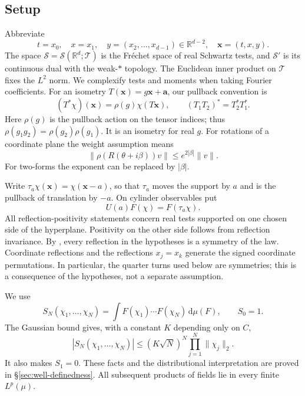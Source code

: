 \documentclass[11pt, letterpaper, reqno]{amsart}
\theoremstyle{definition}
\theoremstyle{remark}
\newcommand{\bbR}{\mathbb{R}}
\newcommand{\calS}{\mathcal{S}}
\newcommand{\calT}{\mathcal{T}}
\newcommand{\bfa}{\mathbf{a}}
\newcommand{\bfx}{\mathbf{x}}
\newcommand{\dd}{\,\mathrm{d}}
\begin{document}
\tableofcontents

\subsection{Setup}
\label{subsec:setup}

Abbreviate
\begin{equation}
 t=x_0,\quad x=x_1,\quad y=(x_2,\dots,x_{d-1})\in\bbR^{d-2},
 \quad \bfx=(t,x,y).
\end{equation}
The space $\calS=\calS(\bbR^d;\calT)$ is the Fr\'echet space of real
Schwartz tests, and $\calS'$ is its continuous dual with the weak-$*$
topology. The Euclidean inner product on $\calT$ fixes the $L^2$ norm.
We complexify tests and moments when taking Fourier coefficients.
For an isometry $T(\bfx)=g\bfx+\bfa$, our pullback convention is
\begin{equation}\label{eq:pullback}
 (T^*\chi)(\bfx)=\rho(g)\chi(T\bfx),\qquad
 (T_1T_2)^*=T_2^*T_1^*.
\end{equation}
Here $\rho(g)$ is the pullback action on the tensor indices; thus
$\rho(g_1g_2)=\rho(g_2)\rho(g_1)$. It is an isometry for real $g$.
For rotations of a coordinate plane the weight assumption means
\begin{equation}\label{eq:tensor-growth}
 \|\rho(R(\theta+i\beta))v\|\leq e^{2|\beta|}\|v\|.
\end{equation}
For two-forms the exponent can be replaced by $|\beta|$.

Write $\tau_a\chi(\bfx)=\chi(\bfx-a)$, so that $\tau_a$ moves
the support by $a$ and is the pullback of translation by $-a$.
On cylinder observables put
\begin{equation}\label{eq:U}
 U(a)F(\chi)=F(\tau_a\chi).
\end{equation}
All reflection-positivity statements concern real tests supported on
one chosen side of the hyperplane. Positivity on the other side follows
from reflection invariance. By , every reflection in
the hypotheses is a symmetry of the law. Coordinate reflections and
the reflections $x_j=x_k$ generate the signed coordinate permutations.
In particular, the quarter turns used below are symmetries; this is
a consequence of the hypotheses, not a separate assumption.

We use
\begin{equation}\label{eq:moments}
 S_N(\chi_1,\dots,\chi_N)=\int F(\chi_1)\cdots F(\chi_N)\dd\mu(F),
 \qquad S_0=1.
\end{equation}
The Gaussian bound gives, with a constant $K$ depending only on $C$,
\begin{equation}\label{eq:moment_bd}
 |S_N(\chi_1,\dots,\chi_N)|\leq(K\sqrt N)^N
       \prod_{j=1}^N\|\chi_j\|_2.
\end{equation}
It also makes $S_1=0$. These facts and the distributional interpretation
are proved in \S\ref{sec:well-definedness}. All subsequent products of
fields lie in every finite $L^p(\mu)$.
\end{document}
